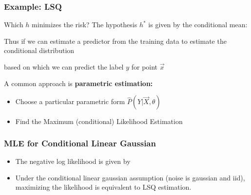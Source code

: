 \documentclass[8pt,a4paper]{scrartcl}
\newcommand{\Argmax}[2]{\text{arg}\underset{#1}{\max}\left(#2\right)}
\begin{document}
\begin{multicols*}{3}
\begin{itemize}
\end{itemize}

\subsubsection{Example: LSQ}


Which $h$ minimizes the risk? The hypothesis $h^\ast$ is given by the conditional mean:


Thus if we can estimate a predictor from the training data to estimate the conditional distribution


based on which we can predict the label $y$ for point $\vec{x}$


A common approach is \textbf{parametric estimation:}

\begin{itemize}
\ncompaq
\item Choose a particular parametric form $\hat{P}(Y|\vec{X},\theta)$
\item Find the Maximum (conditional) Likelihood Estimation

\mportant{$\theta^\ast=\Argmax{\theta}{\hat{P}(y_1,\ldots,y_n|\vec{x}_1,\ldots,\vec{x}_n,\theta)}$}
\end{itemize}

\subsubsection{MLE for Conditional Linear Gaussian}

\begin{itemize}
\ncompaq
\item The negative log likelihood is given by
\item Under the conditional linear gaussian assumption (noise is gaussian and iid), maximizing the likelihood is equivalent to LSQ estimation.
\end{itemize}


\end{multicols*}
\end{document}
